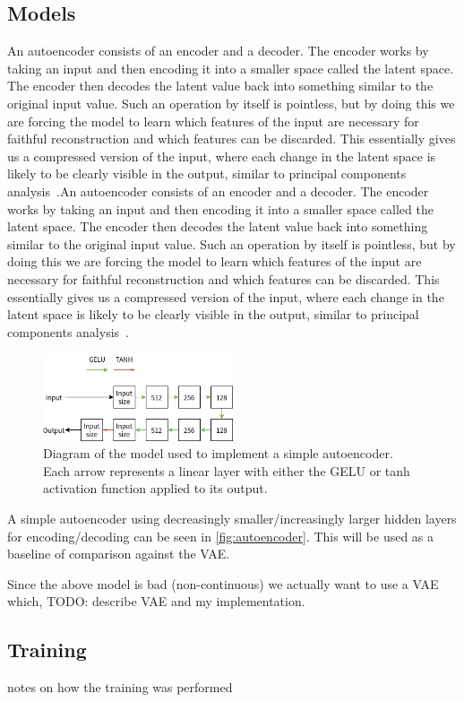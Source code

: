 \subsection{Models}\label{subsec:models}
An autoencoder consists of an encoder and a decoder. The encoder works by taking an input and then encoding it into a smaller space called the latent space. The encoder then decodes the latent value back into something similar to the original input value. Such an operation by itself is pointless, but by doing this we are forcing the model to learn which features of the input are necessary for faithful reconstruction and which features can be discarded. This essentially gives us a compressed version of the input, where each change in the latent space is likely to be clearly visible in the output, similar to principal components analysis~\cite{TODO}.An autoencoder consists of an encoder and a decoder. The encoder works by taking an input and then encoding it into a smaller space called the latent space. The encoder then decodes the latent value back into something similar to the original input value. Such an operation by itself is pointless, but by doing this we are forcing the model to learn which features of the input are necessary for faithful reconstruction and which features can be discarded. This essentially gives us a compressed version of the input, where each change in the latent space is likely to be clearly visible in the output, similar to principal components analysis~\cite{TODO}.


\begin{figure}[h]
\centering
\includegraphics[width=0.5\textwidth]{img/autoencoder}
\caption{Diagram of the model used to implement a simple autoencoder. Each arrow represents a linear layer with either the GELU or tanh activation function applied to its output.}
\label{fig:autoencoder}
\end{figure}

A simple autoencoder using decreasingly smaller/increasingly larger hidden layers for encoding/decoding can be seen in \autoref{fig:autoencoder}. This will be used as a baseline of comparison against the VAE.

Since the above model is bad (non-continuous) we actually want to use a VAE which, TODO: describe VAE and my implementation.

\subsection{Training}\label{subsec:training}
notes on how the training was performed